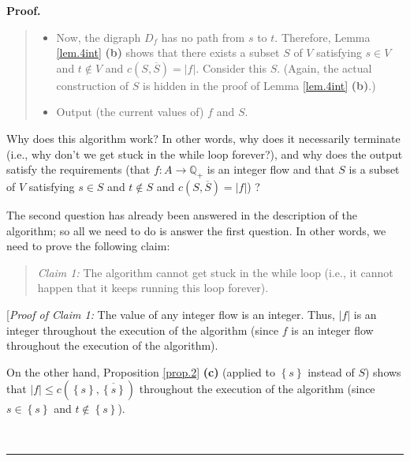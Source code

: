 \documentclass[numbers=enddot,12pt,final,onecolumn,notitlepage]{scrartcl}%
\theoremstyle{definition}
\newenvironment{statement}{\begin{quote}}{\end{quote}}
\newenvironment{proof}[1][Proof]{\noindent\textbf{#1.} }{\ \rule{0.5em}{0.5em}}
\begin{document}
\begin{proof}
\begin{statement}
\begin{itemize}
\begin{itemize}
\item Apply Lemma \ref{lem.4int} \textbf{(a)} to construct an integer flow
$f^{\prime}$ with a larger value than $f$. (Strictly speaking, what we mean is
to apply the construction given in the proof of Lemma \ref{lem.4int}
\textbf{(a)}.)

\item Replace $f$ by $f^{\prime}$. (Thus, the flow $f$ now has a larger value
than it had before.)
\end{itemize}

\textbf{Endwhile}.

\item Now, the digraph $D_{f}$ has no path from $s$ to $t$. Therefore, Lemma
\ref{lem.4int} \textbf{(b)} shows that there exists a subset $S$ of $V$
satisfying $s\in V$ and $t\notin V$ and $c\left(  S,\overline{S}\right)
=\left\vert f\right\vert $. Consider this $S$. (Again, the actual construction
of $S$ is hidden in the proof of Lemma \ref{lem.4int} \textbf{(b)}.)

\item Output (the current values of) $f$ and $S$.
\end{itemize}
\end{statement}

Why does this algorithm work? In other words, why does it necessarily
terminate (i.e., why don't we get stuck in the while loop forever?), and why
does the output satisfy the requirements (that $f:A\rightarrow\mathbb{Q}_{+}$
is an integer flow and that $S$ is a subset of $V$ satisfying $s\in S$ and
$t\notin S$ and $c\left(  S,\overline{S}\right)  =\left\vert f\right\vert $) ?

The second question has already been answered in the description of the
algorithm; so all we need to do is answer the first question. In other words,
we need to prove the following claim:

\begin{statement}
\textit{Claim 1:} The algorithm cannot get stuck in the while loop (i.e., it
cannot happen that it keeps running this loop forever).
\end{statement}

[\textit{Proof of Claim 1:} The value of any integer flow is an integer. Thus,
$\left\vert f\right\vert $ is an integer throughout the execution of the
algorithm (since $f$ is an integer flow throughout the execution of the algorithm).

On the other hand, Proposition \ref{prop.2} \textbf{(c)} (applied to $\left\{
s\right\}  $ instead of $S$) shows that $\left\vert f\right\vert \leq c\left(
\left\{  s\right\}  ,\overline{\left\{  s\right\}  }\right)  $ throughout the
execution of the algorithm (since $s\in\left\{  s\right\}  $ and
$t\notin\left\{  s\right\}  $).


\end{proof}
\end{document}
